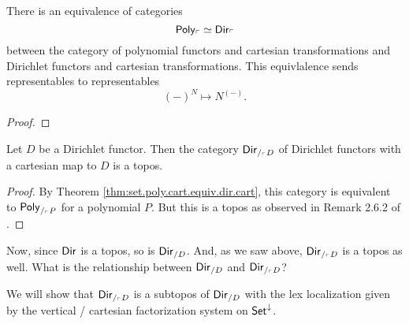 \begin{thm}\label{thm:set.poly.cart.equiv.dir.cart}
  There is an equivalence of categories
  $$\mathsf{{Poly}}_{\ulcorner} \simeq \operatorname{\mathsf{{Dir}}}_{\ulcorner}$$
  between the category of polynomial functors and cartesian transformations and
  Dirichlet functors and cartesian transformations. This equivlalence sends
  representables to representables
  $$(-)^N \mapsto N^{(-)}.$$
\end{thm}
\begin{proof}
\end{proof}

\begin{cor}
  Let $D$ be a Dirichlet functor. Then the category
  $\operatorname{\mathsf{{Dir}}}_{/_{\ulcorner} D}$
  of Dirichlet functors with a cartesian map to $D$ is a topos.
\end{cor}
\begin{proof}
By Theorem \ref{thm:set.poly.cart.equiv.dir.cart}, this category is equivalent
to $\mathsf{{Poly}}_{/_{\ulcorner} P}$ for a polynomial $P$. But this is a topos as
observed in Remark 2.6.2 of \cite{GHK:Analytic.Monads}.
\end{proof}

Now, since $\operatorname{\mathsf{{Dir}}}$ is a topos, so is $\operatorname{\mathsf{{Dir}}}_{/D}$. And, as we saw above,
$\operatorname{\mathsf{{Dir}}}_{/_{\ulcorner} D}$ is a topos as well. What is the relationship between
$\operatorname{\mathsf{{Dir}}}_{/D}$ and $\operatorname{\mathsf{{Dir}}}_{/_{\ulcorner} D}$?

We will show that $\operatorname{\mathsf{{Dir}}}_{/_{\ulcorner} D}$ is a subtopos of $\operatorname{\mathsf{{Dir}}}_{/D}$ with the
lex localization given by the vertical / cartesian factorization system on $\operatorname{\mathsf{{Set}}}^{\mathbin{\downarrow}}$.

